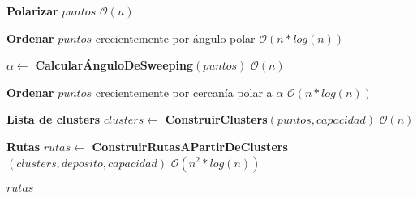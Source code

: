 \begin{algorithm}[H]
\caption{\Comment $\mathcal{O}(n^2*log(n))$}
\begin{algorithmic}[1]
	\State \textbf{Polarizar} $puntos$
	\Comment $\mathcal{O}(n)$
	
	\Statex

	\State \textbf{Ordenar} $puntos$ crecientemente por ángulo polar
	\Comment $\mathcal{O}(n*log(n))$

	\State $\alpha \gets $ \textbf{CalcularÁnguloDeSweeping}$(puntos)$
	\Comment $\mathcal{O}(n)$

	\State \textbf{Ordenar} $puntos$ crecientemente por cercanía polar a $\alpha$
	\Comment $\mathcal{O}(n*log(n))$

	\Statex

	\State \textbf{Lista de clusters} $clusters \gets $ \textbf{ConstruirClusters}$(puntos, capacidad)$
	\Comment $\mathcal{O}(n)$

	\State \textbf{Rutas} $rutas \gets$ \textbf{ConstruirRutasAPartirDeClusters}$(clusters, deposito, capacidad)$
	\Comment $\mathcal{O}(n^2*log(n))$
	
	\Statex
	
	\State \Return $rutas$
\EndFunction
\end{algorithmic}
\end{algorithm}